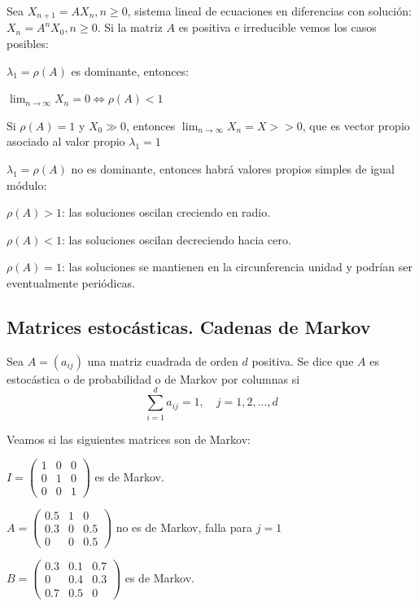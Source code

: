 Sea $X_{n+1}=AX_{n},n\geq 0$, sistema lineal de ecuaciones en diferencias con solución: $X_{n}=A^{n}X_{0},n\geq 0$.
Si la matriz $A$ es positiva e irreducible vemos los casos posibles:
\begin{nlist}
\item $\lambda_{1}=\rho(A)$ es dominante, entonces:
\begin{nlist}
\item $\lim_{n\to\infty}X_{n}=0 \iff \rho(A) < 1$
\item Si $\rho(A)=1$ y $X_{0}\gg 0$, entonces $\lim_{n\to\infty}X_{n}=X >> 0$, que es vector propio asociado al valor propio $\lambda_{1}=1$
\end{nlist}
\item $\lambda_{1}=\rho(A)$ no es dominante, entonces habrá valores propios simples de igual módulo:
\begin{nlist}
\item $\rho(A)> 1$: las soluciones oscilan creciendo en radio.
\item $\rho(A)< 1$: las soluciones oscilan decreciendo hacia cero.
\item $\rho(A) = 1$: las soluciones se mantienen en la circunferencia unidad y podrían ser eventualmente periódicas.
\end{nlist}
\end{nlist}

\subsection{Matrices estocásticas. Cadenas de Markov}
\begin{ndef}
	Sea $A=(a_{ij})$ una matriz cuadrada de orden $d$ positiva. Se dice que $A$ es estocástica o de probabilidad o de Markov por columnas si
	$$\sum^{d}_{i=1}a_{ij}=1, \quad j=1,2,...,d$$
\end{ndef}

\begin{ejemplo}
Veamos si las siguientes matrices son de Markov:
\begin{nlist}
\item$I =
\begin{pmatrix}
1 & 0 & 0 \\
0 & 1 & 0 \\
0 & 0 & 1
\end{pmatrix}
$ es de Markov.
\item $A=
\begin{pmatrix}
0.5 & 1 & 0 \\
0.3 & 0 & 0.5 \\
0 & 0 & 0.5
\end{pmatrix}$ no es de Markov, falla para $j=1$
\item $B=
\begin{pmatrix}
0.3 & 0.1 & 0.7 \\
0 & 0.4 & 0.3 \\
0.7 & 0.5 & 0
\end{pmatrix}$ es de Markov.
\end{nlist}
\end{ejemplo}

